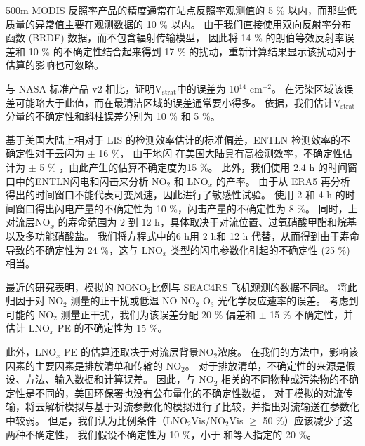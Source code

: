 500m MODIS 反照率产品的精度通常在站点反照率观测值的 5 \% 以内，而那些低质量的异常值主要在观测数据的 10 \% 以内\citep{Schaaf.2011}。
由于我们直接使用双向反射率分布函数 (BRDF) 数据，而不包含辐射传输模型，
因此将 14 \% 的朗伯等效反射率误差和 10 \% 的不确定性结合起来得到 17 \% 的扰动\citep{Laughner.2019a}，重新计算结果显示该扰动对于估算的影响也可忽略。

与 NASA 标准产品 v2 相比，\citet{Krotkov.2017}证明V$_\textrm{strat}$中的误差为 10$^{14}$ cm$^{-2}$。
在污染区域该误差可能略大于此值，而在最清洁区域的误差通常要小得多\citep{Bucsela.2013}。
依据\citet{Allen.2019}，我们估计V$_\textrm{strat}$分量的不确定性和斜柱误差分别为 10 \% 和 5 \%。

基于美国大陆上相对于 LIS 的检测效率估计的标准偏差，ENTLN 检测效率的不确定性对于云闪为 $\pm$ 16 \%，
由于地闪 在美国大陆具有高检测效率，不确定性估计为 $\pm$ 5 \% \citep{Lapierre.2020}，由此产生的估算不确定度为15 \%。
此外，我们使用 2.4 h 的时间窗口中的ENTLN闪电和闪击来分析 NO$_2$ 和 LNO$_x$ 的产率。
由于从 ERA5 再分析得出的时间窗口不能代表可变风速，因此进行了敏感性试验。
使用 2 和 4 h 的时间窗口得出闪电产量的不确定性为 10 \%，闪击产量的不确定性为 8 \%。
同时，上对流层NO$_x$ 的寿命范围为 2 到 12 h，具体取决于对流位置、过氧硝酸甲酯和烷基以及多功能硝酸盐\citep{Nault.2017}。
我们将方程式中的6 h用 2 h和 12 h 代替，从而得到由于寿命导致的不确定性为 24 \%，这与 LNO$_x$ 类型的闪电参数化引起的不确定性 (25 \%) 相当。

最近的研究表明，模拟的 NO∕NO$_2$比例与 SEAC4RS 飞机观测的数据不同\citep{Travis.2016,Silvern.2018}ß。
\citet{Silvern.2018}将此归因于对 NO$_2$ 测量的正干扰或低温 NO-NO$_2$-O$_3$ 光化学反应速率的误差。
考虑到可能的 NO$_2$ 测量正干扰\citep{Allen.2019,Bucsela.2019}，我们为该误差分配 20 \% 偏差和 $\pm$ 15 \% 不确定性，并估计 LNO$_x$ PE 的不确定性为 15 \%。

此外，LNO$_x$ PE 的估算还取决于对流层背景NO$_2$浓度。
在我们的方法中，影响该因素的主要因素是排放清单和传输的 NO$_2$。
对于排放清单，不确定性的来源是假设、方法、输入数据和计算误差。
因此，与 NO$_2$ 相关的不同物种或污染物的不确定性是不同的，美国环保署也没有公布量化的不确定性数据，
对于模拟的对流传输，\citet{Li.2018}将云解析模拟与基于对流参数化的模拟进行了比较，并指出对流输送在参数化中较弱。
但是，我们认为比例条件（LNO$_2$Vis/NO$_2$Vis $\geq$ 50 \%）应该减少了这两种不确定性，
我们假设不确定性为 10 \%，小于 \citet{Allen.2019}和\citet{Bucsela.2019}等人指定的 20 \%。

